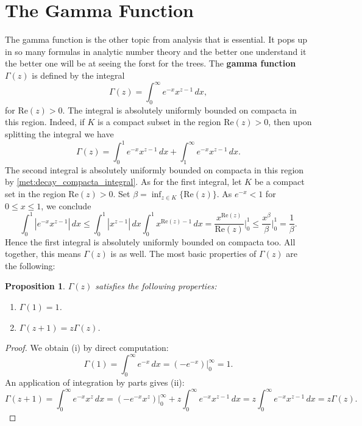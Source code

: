 \documentclass[12pt]{book}
\newtheorem{proposition}{Proposition}[section]
\theoremstyle{definition}\newframedtheorem{method}{Method}
\renewcommand{\b}{\beta}
\newcommand{\G}{\Gamma}
\newcommand{\<}{\langle}
\renewcommand{\>}{\rangle}
\renewcommand{\Re}{\mathrm{Re}}
\begin{document}
  \section{The Gamma Function}
    The gamma function is the other topic from analysis that is essential. It pops up in so many formulas in analytic number theory and the better one understand it the better one will be at seeing the forst for the trees. The \textbf{gamma function} $\G(z)$ is defined by the integral
    \[
      \G(z) = \int_{0}^{\infty}e^{-x}x^{z-1}\,dx,
    \]
    for $\Re(z) > 0$. The integral is absolutely uniformly bounded on compacta in this region. Indeed, if $K$ is a compact subset in the region $\Re(z) > 0$, then upon splitting the integral we have
    \[
      \G(z) = \int_{0}^{1}e^{-x}x^{z-1}\,dx+\int_{1}^{\infty}e^{-x}x^{z-1}\,dx.
    \]
    The second integral is absolutely uniformly bounded on compacta in this region by \cref{met:decay_compacta_integral}. As for the first integral, let $K$ be a compact set in the region $\Re(z) > 0$. Set $\b = \inf_{z \in K}\{\Re(z)\}$. As $e^{-x} < 1$ for $0 \le x \le 1$, we conclude
    \[
      \int_{0}^{1}|e^{-x}x^{z-1}|\,dx \le \int_{0}^{1}|x^{z-1}|\,dx \int_{0}^{1}x^{\Re(z)-1}\,dx = \frac{x^{\Re(z)}}{\Re(z)}\bigg|_{0}^{1} \le \frac{x^{\b}}{\b}\bigg|_{0}^{1} = \frac{1}{\b}.
    \]
    Hence the first integral is absolutely uniformly bounded on compacta too. All together, this means $\G(z)$ is as well. The most basic properties of $\G(z)$ are the following:

    \begin{proposition}\label{prop:Factorial_properties_of_gamma_function}
      $\G(z)$ satisfies the following properties:
      \begin{enumerate}[label=(\roman*)]
        \item $\G(1) = 1$.
        \item $\G(z+1) = z\G(z)$.
      \end{enumerate}
    \end{proposition}
    \begin{proof}
      We obtain (i) by direct computation:
      \[
        \G(1) = \int_{0}^{\infty}e^{-x}\,dx = (-e^{-x})\bigg|_{0}^{\infty} = 1.
      \]
      An application of integration by parts gives (ii):
      \[
        \G(z+1) = \int_{0}^{\infty}e^{-x}x^{z}\,dx = (-e^{-x}x^{z})\bigg|_{0}^{\infty}+z\int_{0}^{\infty}e^{-x}x^{z-1}\,dx = z\int_{0}^{\infty}e^{-x}x^{z-1}\,dx = z\G(z).
      \]
    \end{proof}
\end{document}
